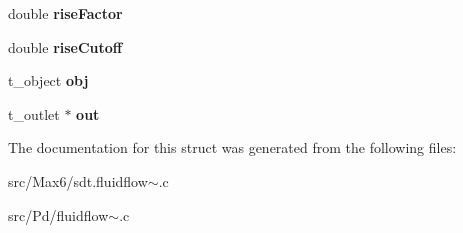 \begin{DoxyCompactItemize}
\item 
\hypertarget{struct__fluidflow_ae622d0f01b7e8bf1f3f56a4c46452ed9}{}double {\bfseries rise\+Factor}\label{struct__fluidflow_ae622d0f01b7e8bf1f3f56a4c46452ed9}

\item 
\hypertarget{struct__fluidflow_a3ddf467f0294073c807ab23b2344914f}{}double {\bfseries rise\+Cutoff}\label{struct__fluidflow_a3ddf467f0294073c807ab23b2344914f}

\item 
\hypertarget{struct__fluidflow_a21775ab6bc98b0961a6e9fd9d832e65b}{}t\+\_\+object {\bfseries obj}\label{struct__fluidflow_a21775ab6bc98b0961a6e9fd9d832e65b}

\item 
\hypertarget{struct__fluidflow_a07b901a5d7d4140b7f701a94bf7f245c}{}t\+\_\+outlet $\ast$ {\bfseries out}\label{struct__fluidflow_a07b901a5d7d4140b7f701a94bf7f245c}

\end{DoxyCompactItemize}


The documentation for this struct was generated from the following files\+:\begin{DoxyCompactItemize}
\item 
src/\+Max6/sdt.\+fluidflow$\sim$.\+c\item 
src/\+Pd/fluidflow$\sim$.\+c\end{DoxyCompactItemize}
